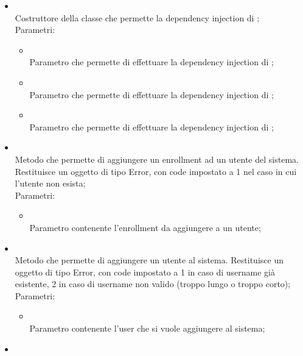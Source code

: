 \begin{itemize}
	\begin{itemize}
		\item[]  \\
		Costruttore della classe  che permette la dependency injection di ;\\
		Parametri:
		\begin{itemize}
			\item {} \\
			Parametro che permette di effettuare la dependency injection di ;
			\item {} \\
			Parametro che permette di effettuare la dependency injection di ;
			\item {} \\
			Parametro che permette di effettuare la dependency injection di ;
		\end{itemize}
		\item[]  \\
		Metodo che permette di aggiungere un enrollment ad un utente del sistema. Restituisce un oggetto di tipo Error, con code impostato a 1 nel caso in cui l'utente non esista;\\
		Parametri:
		\begin{itemize}
			\item {} \\
			Parametro contenente l'enrollment da aggiungere a un utente;
		\end{itemize}
		\item[]  \\
		Metodo che permette di aggiungere un utente al sistema. Restituisce un oggetto di tipo Error, con code impostato a 1 in caso di username già esistente, 2 in caso di username non valido (troppo lungo o troppo corto);\\
		Parametri:
		\begin{itemize}
			\item {} \\
			Parametro contenente l'user che si vuole aggiungere al sistema;
		\end{itemize}
		\item[]  \\

\end{itemize}
\end{itemize}
